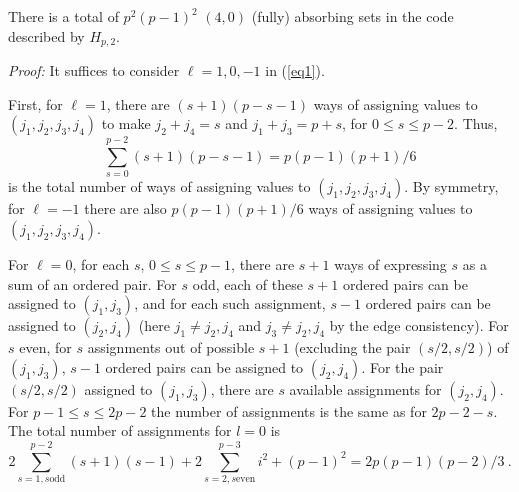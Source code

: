 


\begin{lemma}\label{lemma40} There is a total of $p^2(p-1)^2$ $(4,0)$ (fully) absorbing sets in
the code described by $H_{p,2}$.
\end{lemma}
\noindent \textit{Proof:} It suffices to consider $\ell=1,0,-1$ in
(\ref{eq1}).

First, for $\ell=1$, there are $(s+1)(p-s-1)$ ways of assigning
values to $(j_1,j_2,j_3,j_4)$ to make $j_2+j_4=s$ and
$j_1+j_3=p+s$, for $0 \leq s \leq p-2$. Thus, \[\sum_{s=0}^{p-2}
(s+1)(p-s-1)=p(p-1)(p+1)/6\] is the total number of ways of
assigning values to $(j_1,j_2,j_3,j_4)$. By symmetry, for
$\ell=-1$ there are also $p(p-1)(p+1)/6$ ways of assigning values
to $(j_1,j_2,j_3,j_4)$.

For $\ell=0$, for each $s$, $0 \leq s \leq p-1$, there are $s+1$
ways of expressing $s$ as a sum of an ordered pair. For $s$ odd,
each of these $s+1$ ordered pairs can be assigned to $(j_1,j_3)$,
and for each such assignment, $s-1$ ordered pairs can be assigned
to $(j_2,j_4)$ (here $j_1 \neq j_2,j_4$ and $j_3 \neq j_2,j_4$ by
the edge consistency). For $s$ even, for $s$ assignments out of
possible $s+1$ (excluding the pair $(s/2,s/2)$) of $(j_1,j_3)$,
$s-1$ ordered pairs can be assigned to $(j_2,j_4)$. For the pair
$(s/2,s/2)$ assigned to $(j_1,j_3)$, there are $s$ available
assignments for $(j_2,j_4)$. For $p-1 \leq s \leq 2p-2$ the number
of assignments is the same as for $2p-2-s$. The total number of
assignments for $l=0$ is \[2\sum_{s=1,s \text{odd}}^{p-2}
(s+1)(s-1) + 2\sum_{s=2,s \text{even}}^{p-3} i^2 + (p-1)^2 =
2p(p-1)(p-2)/3~.\]



